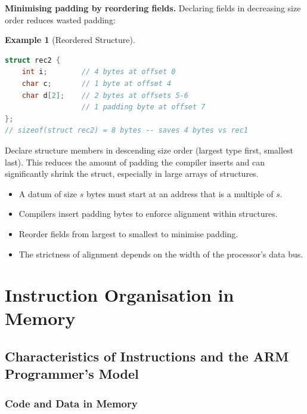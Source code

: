 \documentclass[11pt, a4paper, notitlepage]{report}
\theoremstyle{definition}
\theoremstyle{remark}
\theoremstyle{definition}
\newtheorem{example}[theorem]{Example}
\begin{document}
\textbf{Minimising padding by reordering fields.} Declaring fields in decreasing size order reduces wasted padding:

\begin{example}[Reordered Structure]
\leavevmode
\begin{lstlisting}[language=C]
struct rec2 {
    int i;        // 4 bytes at offset 0
    char c;       // 1 byte at offset 4
    char d[2];    // 2 bytes at offsets 5-6
                  // 1 padding byte at offset 7
};
// sizeof(struct rec2) = 8 bytes -- saves 4 bytes vs rec1
\end{lstlisting}
\end{example}

\begin{examtip}[title={Minimising Structure Size}]
Declare structure members in descending size order (largest type first, smallest last). This reduces the amount of padding the compiler inserts and can significantly shrink the struct, especially in large arrays of structures.
\end{examtip}

\begin{keyresult}[title={Data Alignment Summary}]
\begin{itemize}
  \item A datum of size $s$ bytes must start at an address that is a multiple of $s$.
  \item Compilers insert padding bytes to enforce alignment within structures.
  \item Reorder fields from largest to smallest to minimise padding.
  \item The strictness of alignment depends on the width of the processor's data bus.
\end{itemize}
\end{keyresult}

\chapter{Instruction Organisation in Memory}

\section{Characteristics of Instructions and the ARM Programmer's Model}

\subsection{Code and Data in Memory}
\end{document}

